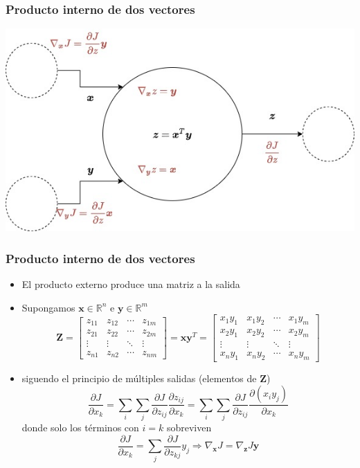 \documentclass{beamer}
\begin{document}
\begin{frame}
\frametitle{Producto interno de dos vectores}
\includegraphics[scale=0.35]{im27}
\end{frame}
\begin{frame}
\frametitle{Producto interno de dos vectores}
\begin{itemize}
\item El producto externo produce una matriz a la salida
\item Supongamos $\boldsymbol{x}\in \mathbb{R}^{n}$ e $\boldsymbol{y} \in \mathbb{R}^{m}$
\begin{equation*}
\boldsymbol{Z}= \begin{bmatrix}
z_{11} & z_{12} & \cdots & z_{1m}\\
z_{21} & z_{22} & \cdots & z_{2m}\\
\vdots & \vdots & \ddots & \vdots \\
z_{n1} & z_{n2} & \cdots & z_{nm}
\end{bmatrix} =\boldsymbol{xy}^T= \begin{bmatrix}
x_1y_1 & x_1y_2 & \cdots & x_1y_m\\
x_2y_1 & x_2y_2 & \cdots & x_2y_m\\
\vdots & \vdots & \ddots & \vdots \\
x_ny_1 & x_ny_2 & \cdots & x_ny_m
\end{bmatrix}
\end{equation*}
\item siguendo el principio de múltiples salidas (elementos de $\boldsymbol{Z}$)
\begin{equation*}
\frac{\partial J}{\partial x_k}=\sum_i\sum_j \frac{\partial J}{\partial z_{ij}}\frac{\partial z_{ij}}{\partial x_k}= \sum_i\sum_j \frac{\partial J}{\partial z_{ij}} \frac{\partial {(x_iy_j)}}{\partial x_k}
\end{equation*}
donde solo los términos con $i=k$ sobreviven 
\begin{equation*}
\frac{\partial J}{\partial x_k}=\sum_j\frac{\partial J}{\partial z_{kj}}y_j \Rightarrow \nabla_{\boldsymbol{x}}J=\nabla_{\boldsymbol{z}} J \boldsymbol{y}
\end{equation*}
\end{itemize}
\end{frame}
\ThankYouFrame
\end{document}
